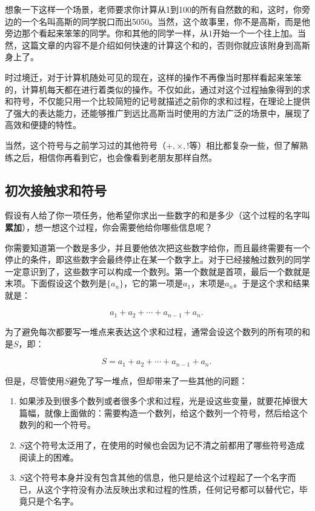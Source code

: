 
\begin{issues}
\issueDraft
\end{issues}


想象一下这样一个场景，老师要求你计算从1到100的所有自然数的和，这时，你旁边的一个名叫高斯的同学脱口而出5050。当然，这个故事里，你不是高斯，而是他旁边那个看起来笨笨的同学。你和其他的同学一样，从$1$开始一个一个往上加。当然，这篇文章的内容不是介绍如何快速的计算这个和的，否则你就应该附身到高斯身上了。

时过境迁，对于计算机随处可见的现在，这样的操作不再像当时那样看起来笨笨的，计算机每天都在进行着类似的操作。不仅如此，通过对这个过程抽象得到的求和符号，不仅能只用一个比较简短的记号就描述之前你的求和过程，在理论上提供了强大的表达能力，还能够推广到远比高斯当时使用的方法广泛的场景中，展现了高效和便捷的特性。

当然，这个符号与之前学习过的其他符号（$+,\times,!$等）相比都复杂一些，但了解熟练之后，相信你再看到它，也会像看到老朋友那样自然。

\subsection{初次接触求和符号}

假设有人给了你一项任务，他希望你求出一些数字的和是多少（这个过程的名字叫\textbf{累加}），想一想这个过程，你会需要他给你哪些信息呢？

你需要知道第一个数是多少，并且要他依次把这些数字给你，而且最终需要有一个停止的条件，即这些数字会最终停止在某一个数字上。对于已经接触过数列的同学一定意识到了，这些数字可以构成一个数列。第一个数就是首项，最后一个数就是末项。下面假设这个数列是$\{a_n\}$，它的第一项是$a_1$，末项是$a_n$。于是这个求和结果就是：

\begin{equation}
a_1+a_2+\cdots+a_{n-1}+a_{n}.~
\end{equation}

为了避免每次都要写一堆点来表达这个求和过程，通常会设这个数列的所有项的和是$S$，即：

\begin{equation}
S=a_1+a_2+\cdots+a_{n-1}+a_{n}.~
\end{equation}

但是，尽管使用$S$避免了写一堆点，但却带来了一些其他的问题：
\begin{enumerate}
\item 如果涉及到很多个数列或者很多个求和过程，光是设这些变量，就要花掉很大篇幅，就像上面做的：需要构造一个数列，给这个数列一个符号，然后给这个数列的和一个符号。
\item $S$这个符号太泛用了，在使用的时候也会因为记不清之前都用了哪些符号造成阅读上的困难。
\item $S$这个符号本身并没有包含其他的信息，他只是给这个过程起了一个名字而已，从这个字符没有办法反映出求和过程的性质，任何记号都可以替代它，毕竟只是个名字。
\end{enumerate}


